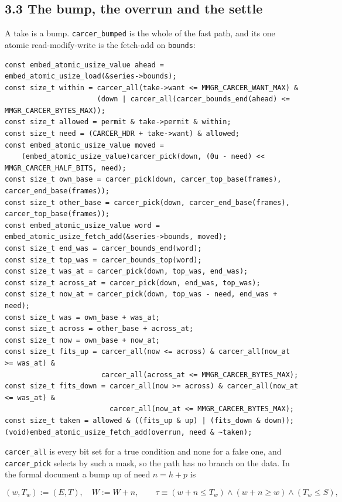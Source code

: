 \subsection{\texorpdfstring{3.3 The bump, the overrun and the settle}{3.3 The bump, the overrun and the settle}}

A take is a bump. \texttt{carcer\_\allowbreak{}bumped} is the whole of the fast path, and its one atomic read-modify-write is the fetch-add on \texttt{bounds}:

\begin{Verbatim}
const embed_atomic_usize_value ahead = embed_atomic_usize_load(&series->bounds);
const size_t within = carcer_all(take->want <= MMGR_CARCER_WANT_MAX) &
                      (down | carcer_all(carcer_bounds_end(ahead) <= MMGR_CARCER_BYTES_MAX));
const size_t allowed = permit & take->permit & within;
const size_t need = (CARCER_HDR + take->want) & allowed;
const embed_atomic_usize_value moved =
    (embed_atomic_usize_value)carcer_pick(down, (0u - need) << MMGR_CARCER_HALF_BITS, need);
const size_t own_base = carcer_pick(down, carcer_top_base(frames), carcer_end_base(frames));
const size_t other_base = carcer_pick(down, carcer_end_base(frames), carcer_top_base(frames));
const embed_atomic_usize_value word = embed_atomic_usize_fetch_add(&series->bounds, moved);
const size_t end_was = carcer_bounds_end(word);
const size_t top_was = carcer_bounds_top(word);
const size_t was_at = carcer_pick(down, top_was, end_was);
const size_t across_at = carcer_pick(down, end_was, top_was);
const size_t now_at = carcer_pick(down, top_was - need, end_was + need);
const size_t was = own_base + was_at;
const size_t across = other_base + across_at;
const size_t now = own_base + now_at;
const size_t fits_up = carcer_all(now <= across) & carcer_all(now_at >= was_at) &
                       carcer_all(across_at <= MMGR_CARCER_BYTES_MAX);
const size_t fits_down = carcer_all(now >= across) & carcer_all(now_at <= was_at) &
                         carcer_all(now_at <= MMGR_CARCER_BYTES_MAX);
const size_t taken = allowed & ((fits_up & up) | (fits_down & down));
(void)embed_atomic_usize_fetch_add(overrun, need & ~taken);
\end{Verbatim}

\texttt{carcer\_\allowbreak{}all} is every bit set for a true condition and none for a false one, and \texttt{carcer\_\allowbreak{}pick} selects by such a mask, so the path has no branch on the data. In the formal document a bump up of need \(n = h + p\) is

\[
(w, T_w) := (E, T),\quad W := W + n, \qquad
\tau \equiv (w + n \le T_w) \wedge (w + n \ge w) \wedge (T_w \le S),
\]

